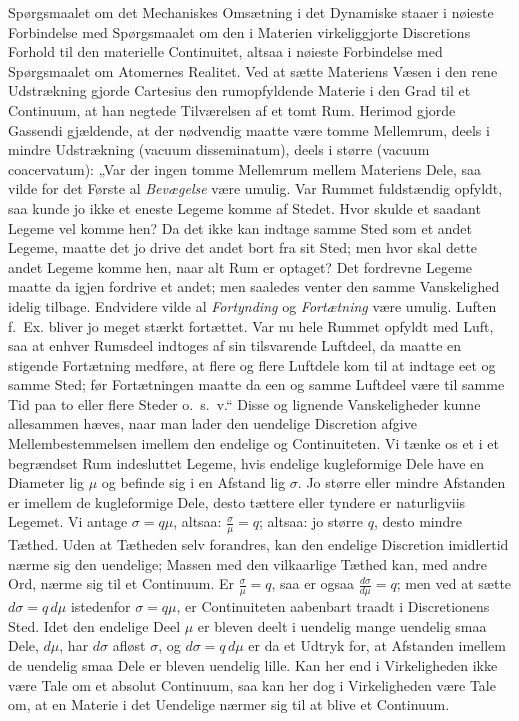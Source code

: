 \documentclass[12pt]{book}
\newcommand{\opage}[1]{\marginnote{\footnotesize\textit{[#1]}}}
\begin{document}
Spørgsmaalet om det Mechaniskes Omsætning i det Dynamiske staaer i nøieste Forbindelse med
Spørgsmaalet om den i Materien virkeliggjorte Discretions Forhold til den materielle
Continuitet, altsaa i nøieste Forbindelse med Spørgsmaalet
\opage{366} om Atomernes Realitet. Ved at sætte Materiens Væsen i den rene Udstrækning gjorde Cartesius
den rumopfyldende Materie i den Grad til et Continuum, at han negtede Tilværelsen af et tomt
Rum. Herimod gjorde Gassendi gjældende, at der nødvendig maatte være tomme Mellemrum, deels
i mindre Udstrækning (vacuum disseminatum), deels i større (vacuum coacervatum): „Var der
ingen tomme Mellemrum mellem Materiens Dele, saa vilde for det Første al \emph{Bevægelse}
være umulig. Var Rummet fuldstændig opfyldt, saa kunde jo ikke et eneste Legeme komme af
Stedet. Hvor skulde et saadant Legeme vel komme hen? Da det ikke kan indtage samme Sted som
et andet Legeme, maatte det jo drive det andet bort fra sit Sted; men hvor skal dette andet
Legeme komme hen, naar alt Rum er optaget? Det fordrevne Legeme maatte da igjen fordrive et
andet; men saaledes venter den samme Vanskelighed idelig tilbage. Endvidere vilde al
\emph{Fortynding} og \emph{Fortætning} være umulig. Luften f.\ Ex. bliver jo meget stærkt
fortættet. Var nu hele Rummet opfyldt med Luft, saa at enhver Rumsdeel indtoges af sin
tilsvarende Luftdeel, da maatte en stigende Fortætning medføre, at flere og flere Luftdele
kom til at indtage eet og samme Sted; før Fortætningen maatte da een og samme Luftdeel være
til samme Tid paa to eller flere Steder o.\ s.\ v.“ Disse og lignende Vanskeligheder kunne
allesammen hæves, naar man lader den uendelige Discretion afgive Mellembestemmelsen imellem
den endelige og Continuiteten. Vi tænke os et i et begrændset Rum indesluttet Legeme, hvis
endelige kugleformige Dele have en Diameter lig $\mu$ og befinde sig i en Afstand lig
$\sigma$. Jo større eller mindre Afstanden er imellem de kugleformige Dele, desto tættere
eller tyndere er naturligviis Legemet. Vi antage $\sigma = q\mu$, altsaa: $\frac{\sigma}{\mu}
= q$; altsaa: jo større $q$, desto mindre Tæthed. Uden at Tætheden selv forandres, kan den
endelige Discretion imidlertid nærme
\opage{367} sig den uendelige; Massen med den vilkaarlige Tæthed kan, med andre Ord, nærme sig til et
Continuum. Er $\frac{\sigma}{\mu} = q$, saa er ogsaa $\frac{d\sigma}{d\mu} = q$; men ved at
sætte $d\sigma = q\,d\mu$ istedenfor $\sigma = q\mu$, er Continuiteten aabenbart traadt i
Discretionens Sted. Idet den endelige Deel $\mu$ er bleven deelt i uendelig mange uendelig
smaa Dele, $d\mu$, har $d\sigma$ afløst $\sigma$, og $d\sigma = q\,d\mu$ er da et Udtryk for,
at Afstanden imellem de uendelig smaa Dele er bleven uendelig lille. Kan her end i
Virkeligheden ikke være Tale om et absolut Continuum, saa kan her dog i Virkeligheden være
Tale om, at en Materie i det Uendelige nærmer sig til at blive et Continuum.
\end{document}
